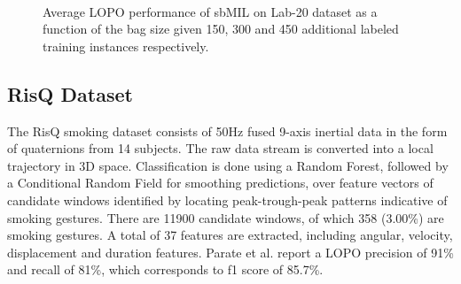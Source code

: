 \documentclass{sigchi}
\begin{document}
\begin{figure}
  \centering
  \qquad
  \qquad
  \caption{Average LOPO performance of sbMIL on Lab-20 dataset as a function of the bag size given 150, 300 and 450 additional labeled training instances respectively. }~\label{fig:figure2}
\end{figure}

\subsection{RisQ Dataset}

The RisQ smoking dataset consists of 50Hz fused 9-axis inertial data in the form of quaternions from 14 subjects. The raw data stream is converted into a local trajectory in 3D space. Classification is done using a Random Forest, followed by a Conditional Random Field for smoothing predictions, over feature vectors of candidate windows identified by locating peak-trough-peak patterns indicative of smoking gestures. There are 11900 candidate windows, of which 358 (3.00\%) are smoking gestures. A total of 37 features are extracted, including angular, velocity, displacement and duration features. Parate et al. report a LOPO precision of 91\% and recall of 81\%, which corresponds to f1 score of 85.7\%.
\end{document}
